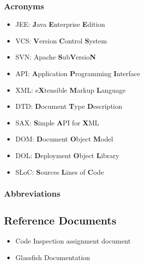 \subsubsection{Acronyms}
\begin{itemize}
	\item JEE: \textbf{J}ava \textbf{E}nterprise \textbf{E}dition
	\item VCS: \textbf{V}ersion \textbf{C}ontrol \textbf{S}ystem
	\item SVN: Apache \textbf{S}ub\textbf{V}ersio\textbf{N}
	\item API: \textbf{A}pplication \textbf{P}rogramming \textbf{I}nterface
	\item XML: e\textbf{X}tensible \textbf{M}arkup \textbf{L}anguage
	\item DTD: \textbf{D}ocument \textbf{T}ype \textbf{D}escription
	\item SAX: \textbf{S}imple \textbf{A}PI for \textbf{X}ML
	\item DOM: \textbf{D}ocument \textbf{O}bject \textbf{M}odel
	\item DOL: \textbf{D}eployment \textbf{O}bject \textbf{L}ibrary
	\item SLoC: \textbf{S}ources \textbf{L}ines of \textbf{C}ode
\end{itemize}
\subsubsection{Abbreviations}
\subsection{Reference Documents}
\begin{itemize}
	\item Code Inspection assignment document
	\item Glassfish Documentation
\end{itemize}
